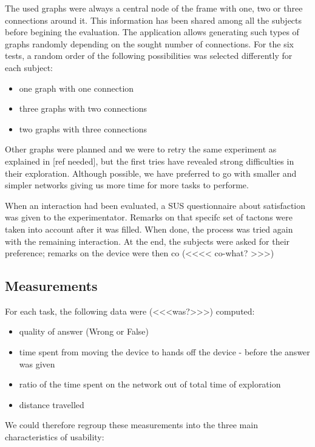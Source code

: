 The used graphs were always a central node of the frame with one, two or three connections around it. This information has been shared among all the subjects before begining the evaluation. The application allows generating such types of graphs randomly depending on the sought number of connections. For the six tests, a random order of the following possibilities was selected differently for each subject:

\begin{itemize}
\item
  one graph with one connection
\item
  three graphs with two connections
\item
  two graphs with three connections
\end{itemize}

Other graphs were planned and we were to retry the same experiment as explained in {[}ref needed{]}, but the first tries have revealed strong
difficulties in their exploration. Although possible, we have preferred to go with smaller and simpler networks giving us more time for more tasks to performe.

When an interaction had been evaluated, a SUS questionnaire about satisfaction was given to the experimentator. Remarks on that specifc set of tactons were taken into account after it was filled. When done, the process was tried again with the remaining interaction. At the end, the subjects were asked for their preference; remarks on the
device were then co (<<<< co-what? >>>)

\subsection{Measurements}\label{measurements}

For each task, the following data were (<<<was?>>>) computed:

\begin{itemize}
\item
  quality of answer (Wrong or False)
\item
  time spent from moving the device to hands off the device - before the
  answer was given
\item
  ratio of the time spent on the network out of total time of
  exploration
\item
  distance travelled
\end{itemize}

We could therefore regroup these measurements into the three main
characteristics of usability:


